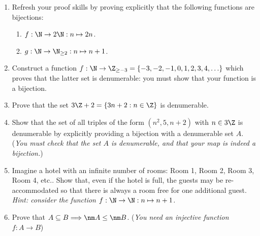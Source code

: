 % 
%   

\begin{exercises}{}{}
\begin{enumerate}
  \item Refresh your proof skills by proving explicitly that the following functions are bijections:
  \begin{enumerate}
    \item $f:\N\to 2\N:n\mapsto 2n$.
    \item $g:\N\to\N_{\ge 2}:n\mapsto n+1$.
  \end{enumerate}
  
	\item Construct a function $f:\N\to\Z_{\ge -3}=\{-3,-2,-1,0,1,2,3,4,\ldots\}$ which proves that the latter set is denumerable: you must show that your function is a bijection.
	
  \item Prove that the set $3\Z+2=\{3n+2:n\in\Z\}$ is denumerable.
	
	\item Show that the set of all triples of the form $(n^2,5,n+2)$ with $n\in 3\Z$ is denumerable by explicitly providing a bijection with a denumerable set $A$. (\emph{You must check that the set $A$ is denumerable, and that your map is indeed a bijection.})

	\item Imagine a hotel with an infinite number of rooms: Room 1, Room 2, Room 3, Room 4, etc.. Show that, even if the hotel is full, the guests may be re-accommodated so that there is always a room free for one additional guest.\\
\emph{Hint: consider the function $f:\N\to\N:n\mapsto n+1$.}
	
	\item Prove that $A\subseteq B\Longrightarrow \nm A\le\nm B$. (\emph{You need an injective function $f:A\to B$})
		

\end{enumerate}
\end{exercises}

